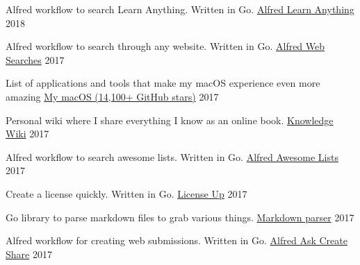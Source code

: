 
\begin{cventries}

  \cventry
    {Alfred workflow to search Learn Anything. Written in Go.}
    {\href{https://github.com/nikitavoloboev/alfred-learn-anything}{Alfred Learn Anything}}
    {}
    {2018}
    {
    }

    \cventry
    {Alfred workflow to search through any website. Written in Go.}
    {\href{https://github.com/nikitavoloboev/alfred-web-searches}{Alfred Web Searches}}
    {}
    {2017}
    {
    }

    \cventry
    {List of applications and tools that make my macOS experience even more amazing}
    {\href{https://github.com/nikitavoloboev/my-mac-os}{My macOS (14,100+ GitHub stars)}}
    {}
    {2017}
    {
    }

    \cventry
    {Personal wiki where I share everything I know as an online book.}
    {\href{https://wiki.nikitavoloboev.xyz}{Knowledge Wiki}}
    {}
    {2017}
    {
    }

    \cventry
    {Alfred workflow to search awesome lists. Written in Go.}
    {\href{https://github.com/nikitavoloboev/alfred-awesome-lists}{Alfred Awesome Lists}}
    {}
    {2017}
    {
    }

    \cventry
    {Create a license quickly. Written in Go.}
    {\href{https://github.com/nikitavoloboev/license-up}{License Up}}
    {}
    {2017}
    {
    }

    \cventry
    {Go library to parse markdown files to grab various things.}
    {\href{https://github.com/nikitavoloboev/markdown-parser}{Markdown parser}}
    {}
    {2017}
    {
    }

    \cventry
    {Alfred workflow for creating web submissions. Written in Go.}
    {\href{https://github.com/nikitavoloboev/alfred-ask-create-share}{Alfred Ask Create Share}}
    {}
    {2017}
    {
    }

\end{cventries}
